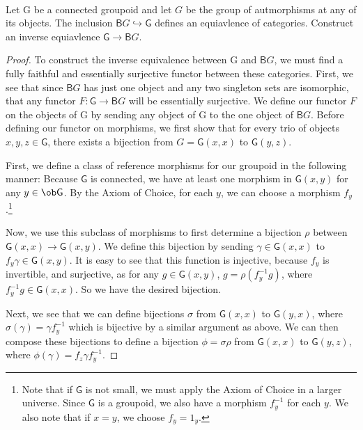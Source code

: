 \documentclass[../../main]{subfiles}
\begin{document}
\paragraph{}
\begin{exercise}
	Let \textsf{G} be a connected groupoid and let $G$ be
	the group of autmorphisms at any of its objects. The inclusion $\textsf{B}G
	\hookrightarrow \textsf{G}$ defines an equiavlence of categories. Construct an
	inverse equiavlence $\textsf{G} \rightarrow \textsf{B}G$.
\end{exercise}
\begin{proof}
	To construct the inverse equivalence between  \textsf{G} and $\textsf{B}G$,
	we must find a fully faithful and essentially surjective functor between
	these categories. First, we see that since $\textsf{B}G$ has just one
	object and any two singleton sets are isomorphic, that any functor $F\colon \textsf{G} \rightarrow \textsf{B}G$ will be
	essentially surjective. We define our functor $F$ on the objects of
	\textsf{G} by sending any object of \textsf{G} to the one object of
	$\textsf{B}G$. Before defining our functor on morphisms, we first show that
	for every trio of objects $x,y,z \in \textsf{G}$, there exists a bijection
	from $G = \textsf{G}(x,x) $ to $\textsf{G}(y,z)$.

	First, we define a class of reference morphisms for our groupoid in the
	following manner: Because $\textsf{G}$ is connected, we have at least one
	morphism in $\textsf{G} (x,y)$ for any $y \in \ob\textsf{G}$. By the Axiom of
	Choice, for each $y$, we can choose a morphism $f_y$.\footnote{Note that if
		$\textsf{G}$ is not small, we must apply the Axiom of Choice in a larger
		universe. Since $\textsf{G}$ is a groupoid, we also have a morphism
		$f_y^{-1}$ for each $y$. We also note that if $x = y$, we choose $f_y =
	1_y$.}

	Now, we use this subclass of morphisms to first determine a bijection $\rho$
	between $\textsf{G}(x,x) \rightarrow \textsf{G}(x,y)$. We define this
	bijection by sending $\gamma \in \textsf{G}(x,x)$ to $f_y\gamma \in
	\textsf{G}(x,y)$. It is easy to see that this function is injective, because
	$f_y$ is invertible, and surjective, as for any $g \in \textsf{G}(x,y)$, $g
	= \rho(f_y^{-1}g)$, where $f_y^{-1}g \in \textsf{G}(x,x)$. So we have the
	desired bijection.

	Next, we see that we can define bijections  $\sigma$ from $\textsf{G}(x,x)$
	to $\textsf{G}(y,x)$, where $\sigma(\gamma) = \gamma f_y^{-1}$ which is
	bijective by a similar argument as above. We can then compose these
	bijections to define a bijection $\phi = \sigma\rho$ from $\textsf{G}(x,x)$
	to $\textsf{G}(y,z)$, where $\phi(\gamma) = f_z\gamma f_y^{-1}$.


\end{proof}
\end{document}
